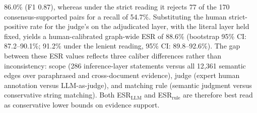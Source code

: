 \documentclass[a4paper,fleqn]{cas-dc}
\begin{document}
86.0\% (F1 0.87), whereas under the strict reading it rejects 77 of
the 170 consensus-supported pairs for a recall of 54.7\%.
Substituting the human strict-positive rate for the judge's on the
adjudicated layer, with the literal layer held fixed, yields a
human-calibrated graph-wide ESR of 88.6\% (bootstrap 95\% CI:
87.2--90.1\%; 91.2\% under the lenient reading, 95\% CI:
89.8--92.6\%).
The gap between these ESR values reflects three caliber differences
rather than inconsistency: scope (286 inference-layer
statements versus all 12{,}361 semantic edges over paraphrased and
cross-document evidence), judge (expert human annotation versus
LLM-as-judge), and matching rule (semantic judgment versus
conservative string matching).
Both ESR$_{\text{LLM}}$ and ESR$_{\text{rule}}$ are therefore best
read as conservative lower bounds on evidence support.
\end{document}
